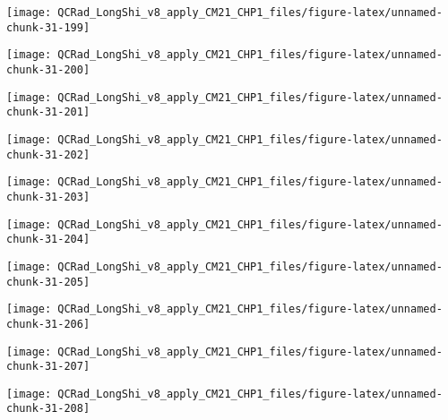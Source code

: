 \documentclass[
  10pt,
  a4paper,oneside]{article}
\begin{document}
\begin{center}\texttt{[image: QCRad\_LongShi\_v8\_apply\_CM21\_CHP1\_files/figure-latex/unnamed-chunk-31-199]} \end{center}

\begin{center}\texttt{[image: QCRad\_LongShi\_v8\_apply\_CM21\_CHP1\_files/figure-latex/unnamed-chunk-31-200]} \end{center}

\begin{center}\texttt{[image: QCRad\_LongShi\_v8\_apply\_CM21\_CHP1\_files/figure-latex/unnamed-chunk-31-201]} \end{center}

\begin{center}\texttt{[image: QCRad\_LongShi\_v8\_apply\_CM21\_CHP1\_files/figure-latex/unnamed-chunk-31-202]} \end{center}

\begin{center}\texttt{[image: QCRad\_LongShi\_v8\_apply\_CM21\_CHP1\_files/figure-latex/unnamed-chunk-31-203]} \end{center}

\begin{center}\texttt{[image: QCRad\_LongShi\_v8\_apply\_CM21\_CHP1\_files/figure-latex/unnamed-chunk-31-204]} \end{center}

\begin{center}\texttt{[image: QCRad\_LongShi\_v8\_apply\_CM21\_CHP1\_files/figure-latex/unnamed-chunk-31-205]} \end{center}

\begin{center}\texttt{[image: QCRad\_LongShi\_v8\_apply\_CM21\_CHP1\_files/figure-latex/unnamed-chunk-31-206]} \end{center}

\begin{center}\texttt{[image: QCRad\_LongShi\_v8\_apply\_CM21\_CHP1\_files/figure-latex/unnamed-chunk-31-207]} \end{center}

\begin{center}\texttt{[image: QCRad\_LongShi\_v8\_apply\_CM21\_CHP1\_files/figure-latex/unnamed-chunk-31-208]} \end{center}
\end{document}
